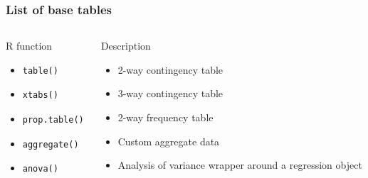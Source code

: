 \documentclass[nogin]{beamer}\usepackage[]{graphicx}\usepackage[]{color}
\begin{document}
\begin{frame}[fragile]
\frametitle{List of base tables}
\begin{columns}[T]
\begin{column}{.5\textwidth}
\begin{block}{R function}
\begin{itemize}
\item \begin{verbatim}table()\end{verbatim}
\item \begin{verbatim}xtabs()\end{verbatim}
\item \begin{verbatim}prop.table()\end{verbatim}
\item \begin{verbatim}aggregate()\end{verbatim}
\item \begin{verbatim}anova()\end{verbatim}
\end{itemize}
\end{block}
\end{column}
\begin{column}{.5\textwidth}
\begin{block}{Description}
\begin{itemize}
\footnotesize
\item 2-way contingency table
\item 3-way contingency table
\item 2-way frequency table
\item Custom aggregate data
\item Analysis of variance wrapper around a regression object
\end{itemize}
\end{block}
\end{column}
\end{columns}
\end{frame}
\end{document}

